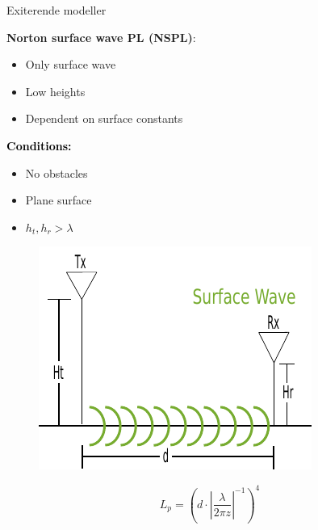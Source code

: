 \begin{frame}{Exiterende modeller}
\begin{minipage}{.45\textwidth}
\raggedright\textcolor{thomasgreen}{\textbf{Norton surface wave PL (NSPL)}:}
\begin{itemize}
\item Only surface wave
\item Low heights
\item Dependent on surface constants
\end{itemize}

\vspace{1em}
\textcolor{black}{\textbf{Conditions:}}
\begin{itemize}
\item No obstacles
\item Plane surface
\item $h_t,h_r > \lambda$
\end{itemize}

\end{minipage}%
\begin{minipage}{0.5\textwidth}
\begin{figure}[!htbp]
 \centering
  \includegraphics[width = \columnwidth]{figures/surf_illu.pdf}
  \end{figure}
\end{minipage}

\vspace{1em}
\begin{equation}
L_p=\left({d} \cdot \left|\frac{\lambda}{2\pi z}\right|^{-1}\right)^4
\label{surface_wave}
\end{equation}
\end{frame}



